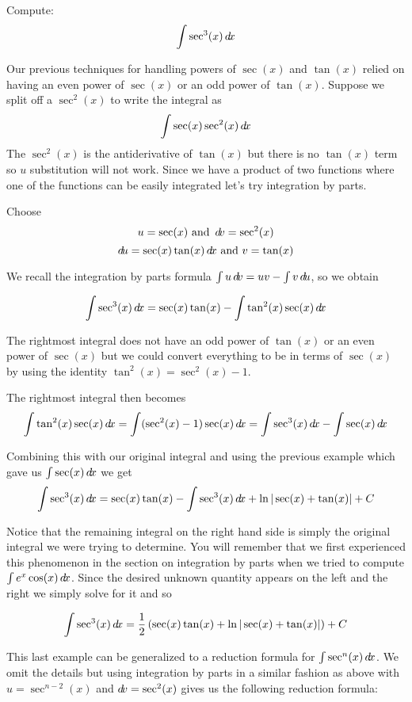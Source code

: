 \documentclass{ximera}
\begin{document}
\begin{example}
Compute: 
\[
\int \sec^{3}(x) \mathop{}\!d\! x 
\]
\begin{explanation}
Our previous techniques for handling powers of $\sec(x)$ and $\tan(x)$ relied on having an even power of $\sec(x)$ or an odd power of $\tan(x)$. 
Suppose we split off a $\sec^{2}(x)$ to write the integral as 
\[
 \int \sec(x) \sec^{2}(x) \mathop{}\!d\! x
\]
The $\sec^{2}(x)$ is the antiderivative of $\tan(x)$ but there is no $\tan(x)$ term so $u$ substitution will not work. Since we have a product of two functions where one 
of the functions can be easily integrated let's try integration by parts. 

Choose
\[ 
u= \sec(x) \text{  and  } \mathop{}\!d\! v=\sec^{2}(x) \\
\] 
\[
\mathop{}\!d\! u=  \sec(x)\tan(x) \mathop{}\!d\! x \text{  and  } v=\tan(x) 
\]

We recall the integration by parts formula $\int u \mathop{}\!d\! v=uv-\int v \mathop{}\!d\! u$, so we obtain

\[
\int \sec^{3}(x) \mathop{}\!d\! x=\sec(x)\tan(x) - \int \tan^{2}(x)\sec(x)\mathop{}\!d\! x
\]

The rightmost integral does not have an odd power of $\tan(x)$ or an even power of $\sec(x)$ but we could convert 
everything to be in terms of $\sec(x)$ by using the identity $\tan^{2}(x)=\sec^{2}(x)-1$. 

The rightmost integral then becomes
\[
\int \tan^{2}(x)\sec(x) \d x=\int (\sec^{2}(x)-1) \sec(x) \d x= \int \sec^{3}(x)\d x - \int \sec(x) \d x
\]

Combining this with our original integral and using the previous example which gave us $\int \sec(x) \mathop{}\!d\! x$ we get
\[
\int \sec^3(x)  \mathop{}\!d\! x=\sec(x) \tan(x)- \int \sec^3(x)  \mathop{}\!d\! x + \ln| \sec(x)+\tan(x) | + C
\]

Notice that the remaining integral on the right hand side is simply the original integral we were trying to determine. You will remember that we first experienced this phenomenon in the section on integration by parts when we tried to compute $\int e^{x}\cos(x) \mathop{}\!d\! x$. 
Since the desired unknown quantity appears on the left and the right we simply solve for it and so

\[
\int \sec^{3}(x) \mathop{}\!d\! x=\frac{1}{2}\left(\sec(x) \tan(x) + \ln | \sec(x) + \tan(x)|  \right)  + C
\]
\end{explanation}
\end{example}

This last example can be generalized to a reduction formula for $\int \sec^{n}(x) \mathop{}\!d\! x$. We omit the details but using integration by parts in a similar fashion
as above with $u=\sec^{n-2}(x)$ and $\mathop{}\!d\! v=\sec^{2}(x)$ gives us the following reduction formula:
\end{document}
